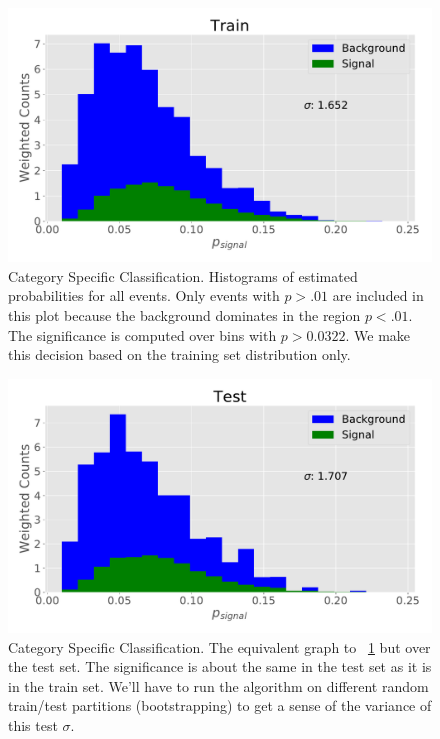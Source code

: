 \documentclass[11pt]{article}
\begin{document}
\begin{enumerate}
\begin{figure}[!htbp]
    \begin{center}
    \includegraphics[width=150mm]{train.pdf}
    \caption{Category Specific Classification. Histograms of estimated probabilities for all events. Only events with $p>.01$ are included in this plot because the background dominates in the region $p<.01$. The significance is computed over bins with $p>0.0322$. We make this decision based on the training set distribution only.}
    \label{fig:train}
    \end{center}
\end{figure}

\begin{figure}
    \begin{center}
    \includegraphics[width=150mm]{test.pdf}
    \centering
    \caption{Category Specific Classification. The equivalent graph to ~\ref{fig:train} but over the test set. The significance is about the same in the test set as it is in the train set. We'll have to run the algorithm on different random train/test partitions (bootstrapping) to get a sense of the variance of this test $\sigma$.}
    \label{fig:test}
    \end{center}
\end{figure}





\end{enumerate}
\end{document}
